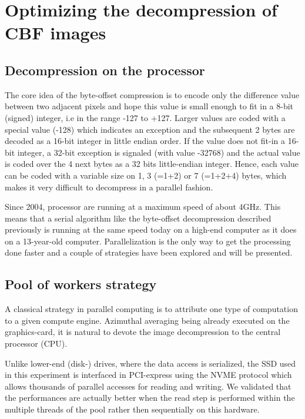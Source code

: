 \documentclass[preprint]{iucr}              %
\begin{document}
\section{Optimizing the decompression of CBF images}

\subsection{Decompression on the processor}

The core idea of the byte-offset compression is to encode only the difference
value between two adjacent pixels and hope this value is small enough to fit in
a 8-bit (signed) integer, i.e in the range -127 to +127.
Larger values are coded with a special value (-128) which indicates an exception
and the subsequent 2 bytes are decoded as a 16-bit integer in little endian
order.
If the value does not fit-in a 16-bit integer, a 32-bit exception is
signaled (with value -32768) and the actual value is coded over the 4 next bytes
as a 32 bits little-endian integer.
Hence, each value can be coded with a variable size on 1, 3 (=1+2) or 7 (=1+2+4)
bytes, which makes it very difficult to decompress in a parallel fashion.

Since 2004, processor are running at a maximum speed of about 4GHz. 
This means that a serial algorithm like the byte-offset decompression described
previously is running at the same speed today on a high-end computer as it
does on a 13-year-old computer.
Parallelization is the only way to get the processing done faster and a couple
of strategies have been explored and will be presented.

\subsection{Pool of workers strategy} 

A classical strategy in parallel computing is to attribute one type of
computation to a given compute engine.
Azimuthal averaging being already executed on the graphics-card, it is natural
to devote the image decompression to the central processor (CPU).

Unlike lower-end (disk-) drives, where the data access is serialized,
the SSD used in this experiment is interfaced in PCI-express using the NVME
protocol \cite{nvme} which allows thousands of parallel accesses for reading and
writing.
We validated that the performances are actually better when the read step is
performed within the multiple threads of the pool rather then sequentially on
this hardware.
\end{document}
